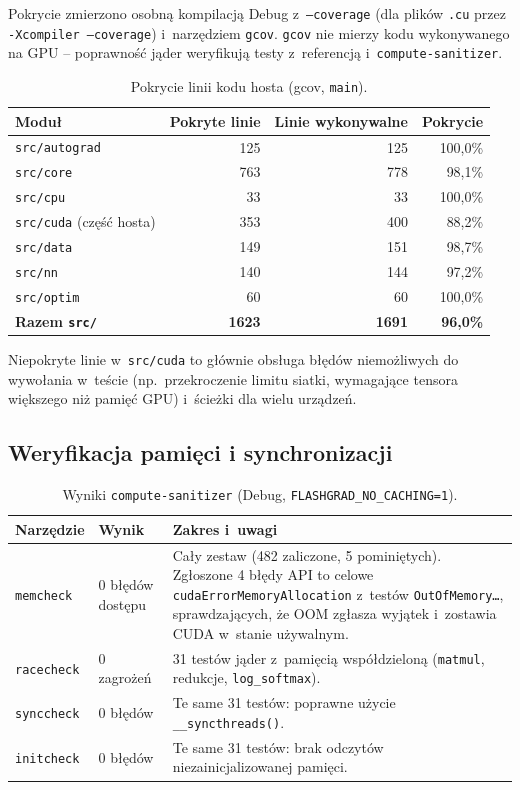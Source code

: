 \documentclass[11pt,a4paper]{article}
\begin{document}
Pokrycie zmierzono osobną kompilacją Debug z~\texttt{--coverage} (dla plików \texttt{.cu}
przez \texttt{-Xcompiler --coverage}) i~narzędziem \texttt{gcov}. \texttt{gcov} nie mierzy
kodu wykonywanego na GPU -- poprawność jąder weryfikują testy z~referencją
i~\texttt{compute-sanitizer}.

\begin{table}[H]
\centering
\caption{Pokrycie linii kodu hosta (gcov, \texttt{main}).}
\label{tab:cov}
\begin{tabular}{@{}lrrr@{}}
\toprule
\textbf{Moduł} & \textbf{Pokryte linie} & \textbf{Linie wykonywalne} & \textbf{Pokrycie} \\
\midrule
\texttt{src/autograd} & 125 & 125 & 100,0\% \\
\texttt{src/core}     & 763 & 778 & 98,1\% \\
\texttt{src/cpu}      & 33  & 33  & 100,0\% \\
\texttt{src/cuda} (część hosta) & 353 & 400 & 88,2\% \\
\texttt{src/data}     & 149 & 151 & 98,7\% \\
\texttt{src/nn}       & 140 & 144 & 97,2\% \\
\texttt{src/optim}    & 60  & 60  & 100,0\% \\
\midrule
\textbf{Razem \texttt{src/}} & \textbf{1623} & \textbf{1691} & \textbf{96,0\%} \\
\bottomrule
\end{tabular}
\end{table}

Niepokryte linie w~\texttt{src/cuda} to głównie obsługa błędów niemożliwych do wywołania
w~teście (np.\ przekroczenie limitu siatki, wymagające tensora większego niż pamięć GPU)
i~ścieżki dla wielu urządzeń.

\subsection{Weryfikacja pamięci i synchronizacji}

\begin{table}[H]
\centering
\caption{Wyniki \texttt{compute-sanitizer} (Debug, \texttt{FLASHGRAD\_NO\_CACHING=1}).}
\label{tab:san}
\begin{tabularx}{\textwidth}{@{}llX@{}}
\toprule
\textbf{Narzędzie} & \textbf{Wynik} & \textbf{Zakres i~uwagi} \\
\midrule
\texttt{memcheck}  & 0 błędów dostępu & Cały zestaw (482 zaliczone, 5 pominiętych). Zgłoszone
  4 błędy API to celowe \texttt{cudaErrorMemoryAllocation} z~testów
  \texttt{OutOfMemory\ldots}, sprawdzających, że OOM zgłasza wyjątek i~zostawia CUDA
  w~stanie używalnym. \\
\texttt{racecheck} & 0 zagrożeń & 31 testów jąder z~pamięcią współdzieloną
  (\texttt{matmul}, redukcje, \texttt{log\_softmax}). \\
\texttt{synccheck} & 0 błędów & Te same 31 testów: poprawne użycie \texttt{\_\_syncthreads()}. \\
\texttt{initcheck} & 0 błędów & Te same 31 testów: brak odczytów niezainicjalizowanej pamięci. \\
\bottomrule
\end{tabularx}
\end{table}
\end{document}
